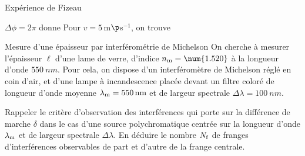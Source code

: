 \begin{exo}[MPSI]{Expérience de Fizeau}
\begin{quest}
{ $\Delta \phi = 2\pi$ donne 
Pour $v = 5\,$m$\p$s$^{-1}$, on trouve 
}

\end{quest}

\end{exo}


\begin{exo}[PC][2][TD]{Mesure d'une épaisseur par interférométrie de Michelson}
On cherche à mesurer l'épaisseur $\ell$ d'une lame de verre, d'indice $n_{\rm m}=\num{1.520}$ à la longueur d'onde $\SI{550}{nm}$. Pour cela, on dispose d'un interféromètre de Michelson réglé en coin d’air, et d'une lampe à incandescence placée devant un filtre coloré de longueur d'onde moyenne $\lambda_{\rm m}=\SI{550}{nm}$ et de largeur spectrale $\Delta \lambda = \SI{100}{nm}$.%
\begin{quest}
\item Rappeler le critère d'observation des interférences qui porte sur la différence de marche $\delta$ dans le cas d'une source polychromatique centrée sur la longueur d'onde $\lambda_{\rm m}$ et de largeur spectrale $\Delta\lambda$. En déduire le nombre $N_{\rm f}$ de franges d'interférences observables de part et d'autre de la frange centrale. %
\end{quest}
\end{exo}
